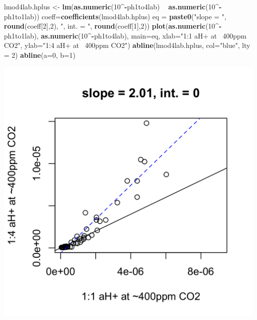 \documentclass[]{article}
\newenvironment{Shaded}{\begin{snugshade}}{\end{snugshade}}
\newcommand{\DataTypeTok}[1]{\textcolor[rgb]{0.13,0.29,0.53}{#1}}
\newcommand{\DecValTok}[1]{\textcolor[rgb]{0.00,0.00,0.81}{#1}}
\newcommand{\KeywordTok}[1]{\textcolor[rgb]{0.13,0.29,0.53}{\textbf{#1}}}
\newcommand{\NormalTok}[1]{#1}
\newcommand{\OperatorTok}[1]{\textcolor[rgb]{0.81,0.36,0.00}{\textbf{#1}}}
\newcommand{\StringTok}[1]{\textcolor[rgb]{0.31,0.60,0.02}{#1}}
\begin{document}
\begin{Shaded}
\begin{Highlighting}[]
\NormalTok{lmod4lab.hplus <-}\StringTok{ }\KeywordTok{lm}\NormalTok{(}\KeywordTok{as.numeric}\NormalTok{(}\DecValTok{10}\OperatorTok{^-}\NormalTok{ph1to4lab) }\OperatorTok{~}\StringTok{ }\KeywordTok{as.numeric}\NormalTok{(}\DecValTok{10}\OperatorTok{^-}\NormalTok{ph1to1lab))}
\NormalTok{coeff=}\KeywordTok{coefficients}\NormalTok{(lmod4lab.hplus)}
\NormalTok{eq =}\StringTok{ }\KeywordTok{paste0}\NormalTok{(}\StringTok{"slope = "}\NormalTok{, }\KeywordTok{round}\NormalTok{(coeff[}\DecValTok{2}\NormalTok{],}\DecValTok{2}\NormalTok{), }\StringTok{", int. = "}\NormalTok{, }\KeywordTok{round}\NormalTok{(coeff[}\DecValTok{1}\NormalTok{],}\DecValTok{2}\NormalTok{))}
\KeywordTok{plot}\NormalTok{(}\KeywordTok{as.numeric}\NormalTok{(}\DecValTok{10}\OperatorTok{^-}\NormalTok{ph1to1lab), }\KeywordTok{as.numeric}\NormalTok{(}\DecValTok{10}\OperatorTok{^-}\NormalTok{ph1to4lab), }\DataTypeTok{main=}\NormalTok{eq,}
   \DataTypeTok{xlab=}\StringTok{"1:1 aH+ at ~400ppm CO2"}\NormalTok{, }\DataTypeTok{ylab=}\StringTok{"1:4 aH+ at ~400ppm CO2"}\NormalTok{)}
\KeywordTok{abline}\NormalTok{(lmod4lab.hplus, }\DataTypeTok{col=}\StringTok{"blue"}\NormalTok{, }\DataTypeTok{lty =} \DecValTok{2}\NormalTok{)}
\KeywordTok{abline}\NormalTok{(}\DataTypeTok{a=}\DecValTok{0}\NormalTok{, }\DataTypeTok{b=}\DecValTok{1}\NormalTok{)}
\end{Highlighting}
\end{Shaded}

\includegraphics{output-rmd/whitman-figure-request-4-lab-hplus-wisc-1.png}
\end{document}
